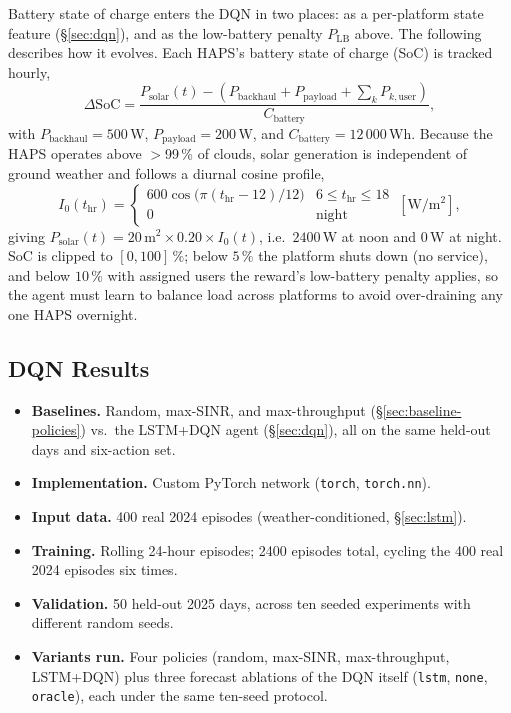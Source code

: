 \documentclass[]{ieeeaccess}
\begin{document}
Battery state of charge enters the DQN in two places: as a per-platform state feature (\S\ref{sec:dqn}), and as the low-battery penalty $P_\mathrm{LB}$ above. The following describes how it evolves. Each HAPS's battery state of charge (SoC) is tracked hourly,
\begin{equation}
\Delta\mathrm{SoC} = \frac{P_\mathrm{solar}(t) - (P_\mathrm{backhaul}+P_\mathrm{payload}+\sum_k P_{k,\mathrm{user}})}{C_\mathrm{battery}},
\label{eq:battery-balance}
\end{equation}
with $P_\mathrm{backhaul}=500$\,W, $P_\mathrm{payload}=200$\,W, and $C_\mathrm{battery}=12\,000$\,Wh. Because the HAPS operates above $>$99\,\% of clouds, solar generation is independent of ground weather and follows a diurnal cosine profile,
\begin{equation}
I_0(t_\mathrm{hr}) = \begin{cases} 600\cos\!\big(\pi(t_\mathrm{hr}-12)/12\big) & 6\le t_\mathrm{hr}\le 18\\ 0 & \text{night}\end{cases}\ [\mathrm{W/m^2}],
\end{equation}
giving $P_\mathrm{solar}(t)=20\,\mathrm{m}^2\times0.20\times I_0(t)$, i.e.\ $2400$\,W at noon and $0$\,W at night. SoC is clipped to $[0,100]\,\%$; below $5\,\%$ the platform shuts down (no service), and below $10\,\%$ with assigned users the reward's low-battery penalty applies, so the agent must learn to balance load across platforms to avoid over-draining any one HAPS overnight.

\subsection{DQN Results}
\label{sec:dqn-results}

\begin{itemize}\setlength{\itemsep}{1pt}
  \item \textbf{Baselines.} Random, max-SINR, and max-throughput (\S\ref{sec:baseline-policies}) vs.\ the LSTM+DQN agent (\S\ref{sec:dqn}), all on the same held-out days and six-action set.
  \item \textbf{Implementation.} Custom PyTorch network (\texttt{torch}, \texttt{torch.nn}).
  \item \textbf{Input data.} 400 real 2024 episodes (weather-conditioned, \S\ref{sec:lstm}).
  \item \textbf{Training.} Rolling 24-hour episodes; 2400 episodes total, cycling the 400 real 2024 episodes six times.
  \item \textbf{Validation.} 50 held-out 2025 days, across ten seeded experiments with different random seeds.
  \item \textbf{Variants run.} Four policies (random, max-SINR, max-throughput, LSTM+DQN) plus three forecast ablations of the DQN itself (\texttt{lstm}, \texttt{none}, \texttt{oracle}), each under the same ten-seed protocol.
\end{itemize}
\end{document}
